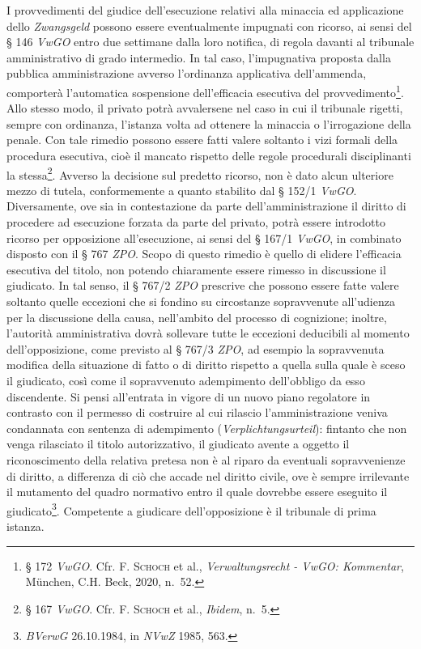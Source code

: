 \documentclass[12pt,it,a4paper,]{report}
\begin{document}
I provvedimenti del giudice dell'esecuzione relativi alla minaccia ed
applicazione dello \emph{Zwangsgeld} possono essere eventualmente
impugnati con ricorso, ai sensi del § 146 \emph{VwGO} entro due
settimane dalla loro notifica, di regola davanti al tribunale
amministrativo di grado intermedio. In tal caso, l'impugnativa proposta
dalla pubblica amministrazione avverso l'ordinanza applicativa
dell'ammenda, comporterà l'automatica sospensione dell'efficacia
esecutiva del provvedimento\footnote{§ 172 \emph{VwGO}. Cfr. F.
  \textsc{Schoch} et al., \emph{Verwaltungsrecht - VwGO: Kommentar},
  München, C.H. Beck, 2020, n.~52.}. Allo stesso modo, il privato potrà
avvalersene nel caso in cui il tribunale rigetti, sempre con ordinanza,
l'istanza volta ad ottenere la minaccia o l'irrogazione della penale.
Con tale rimedio possono essere fatti valere soltanto i vizi formali
della procedura esecutiva, cioè il mancato rispetto delle regole
procedurali disciplinanti la stessa\footnote{§ 167 \emph{VwGO}. Cfr. F.
  \textsc{Schoch} et al., \emph{Ibidem}, n.~5.}. Avverso la decisione
sul predetto ricorso, non è dato alcun ulteriore mezzo di tutela,
conformemente a quanto stabilito dal § 152/1 \emph{VwGO}. Diversamente,
ove sia in contestazione da parte dell'amministrazione il diritto di
procedere ad esecuzione forzata da parte del privato, potrà essere
introdotto ricorso per opposizione all'esecuzione, ai sensi del § 167/1
\emph{VwGO}, in combinato disposto con il § 767 \emph{ZPO}. Scopo di
questo rimedio è quello di elidere l'efficacia esecutiva del titolo, non
potendo chiaramente essere rimesso in discussione il giudicato. In tal
senso, il § 767/2 \emph{ZPO} prescrive che possono essere fatte valere
soltanto quelle eccezioni che si fondino su circostanze sopravvenute
all'udienza per la discussione della causa, nell'ambito del processo di
cognizione; inoltre, l'autorità amministrativa dovrà sollevare tutte le
eccezioni deducibili al momento dell'opposizione, come previsto al §
767/3 \emph{ZPO}, ad esempio la sopravvenuta modifica della situazione
di fatto o di diritto rispetto a quella sulla quale è sceso il
giudicato, così come il sopravvenuto adempimento dell'obbligo da esso
discendente. Si pensi all'entrata in vigore di un nuovo piano regolatore
in contrasto con il permesso di costruire al cui rilascio
l'amministrazione veniva condannata con sentenza di adempimento
(\emph{Verplichtungsurteil}): fintanto che non venga rilasciato il
titolo autorizzativo, il giudicato avente a oggetto il riconoscimento
della relativa pretesa non è al riparo da eventuali sopravvenienze di
diritto, a differenza di ciò che accade nel diritto civile, ove è sempre
irrilevante il mutamento del quadro normativo entro il quale dovrebbe
essere eseguito il giudicato\footnote{\emph{BVerwG} 26.10.1984, in
  \emph{NVwZ} 1985, 563.}. Competente a giudicare dell'opposizione è il
tribunale di prima istanza.
\end{document}
